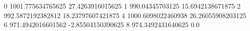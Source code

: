 0 1001.775634765625 27.4263916015625
1 990.04345703125 15.6942138671875
2 992.5872192382812 18.23797607421875
4 1000.6098022460938 26.26055908203125
6 971.4942016601562 -2.85504150390625
8 974.3492431640625 0.0
